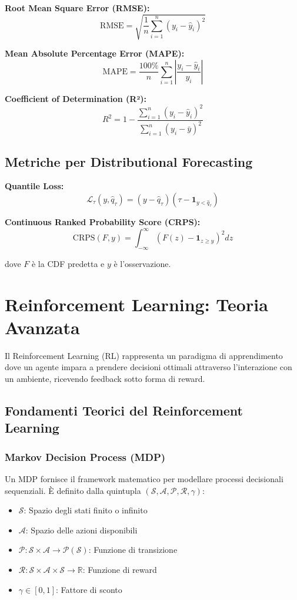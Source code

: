 \documentclass[12pt,a4paper,twoside]{report}
\begin{document}
\textbf{Root Mean Square Error (RMSE):}
$$\text{RMSE} = \sqrt{\frac{1}{n} \sum_{i=1}^{n} (y_i - \hat{y}_i)^2}$$

\textbf{Mean Absolute Percentage Error (MAPE):}
$$\text{MAPE} = \frac{100\%}{n} \sum_{i=1}^{n} \left|\frac{y_i - \hat{y}_i}{y_i}\right|$$

\textbf{Coefficient of Determination (R²):}
$$R^2 = 1 - \frac{\sum_{i=1}^{n}(y_i - \hat{y}_i)^2}{\sum_{i=1}^{n}(y_i - \bar{y})^2}$$

\subsection{Metriche per Distributional Forecasting}

\textbf{Quantile Loss:}
$$\mathcal{L}_{\tau}(y, \hat{q}_{\tau}) = (y - \hat{q}_{\tau})(\tau - \mathbf{1}_{y < \hat{q}_{\tau}})$$

\textbf{Continuous Ranked Probability Score (CRPS):}
$$\text{CRPS}(F, y) = \int_{-\infty}^{\infty} (F(z) - \mathbf{1}_{z \geq y})^2 dz$$

dove $F$ è la CDF predetta e $y$ è l'osservazione.

\section{Reinforcement Learning: Teoria Avanzata}

Il Reinforcement Learning (RL) rappresenta un paradigma di apprendimento dove un agente impara a prendere decisioni ottimali attraverso l'interazione con un ambiente, ricevendo feedback sotto forma di reward.

\subsection{Fondamenti Teorici del Reinforcement Learning}

\subsubsection{Markov Decision Process (MDP)}

Un MDP fornisce il framework matematico per modellare processi decisionali sequenziali. È definito dalla quintupla $(\mathcal{S}, \mathcal{A}, \mathcal{P}, \mathcal{R}, \gamma)$:

\begin{itemize}
    \item $\mathcal{S}$: Spazio degli stati finito o infinito
    \item $\mathcal{A}$: Spazio delle azioni disponibili
    \item $\mathcal{P}: \mathcal{S} \times \mathcal{A} \rightarrow \mathcal{P}(\mathcal{S})$: Funzione di transizione
    \item $\mathcal{R}: \mathcal{S} \times \mathcal{A} \times \mathcal{S} \rightarrow \mathbb{R}$: Funzione di reward
    \item $\gamma \in [0,1]$: Fattore di sconto
\end{itemize}
\end{document}
